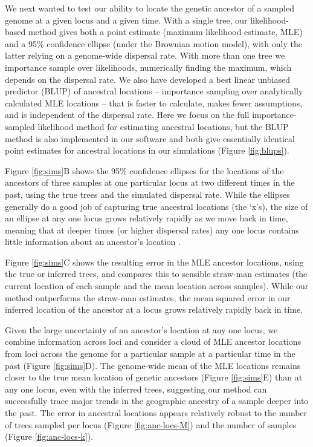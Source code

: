 \documentclass[12pt]{article}
\begin{document}
We next wanted to test our ability to locate the genetic ancestor of a sampled genome at a given locus and a given time.
With a single tree, our likelihood-based method gives both a point estimate (maximum likelihood estimate, MLE) and a 95\% confidence ellipse (under the Brownian motion model), with only the latter relying on a genome-wide dispersal rate. 
With more than one tree we importance sample over likelihoods, numerically finding the maximum, which depends on the dispersal rate. 
We also have developed a best linear unbiased predictor (BLUP) of ancestral locations -- importance sampling over analytically calculated MLE locations -- that is faster to calculate, makes fewer assumptions, and is independent of the dispersal rate. 
Here we focus on the full importance-sampled likelihood method for estimating ancestral locations, but the BLUP method is also implemented in our software and both give essentially identical point estimates for ancestral locations in our simulations (Figure \ref{fig:blups}).

Figure \ref{fig:sims}B shows the 95\% confidence ellipses for the locations of the ancestors of three samples at one particular locus at two different times in the past, using the true trees and the simulated dispersal rate.
While the ellipses generally do a good job of capturing true ancestral locations (the `x's), the size of an ellipse at any one locus grows relatively rapidly as we move back in time, meaning that at deeper times (or higher dispersal rates) any one locus contains little information about an ancestor's location \citep[as is the case for ancestral state reconstruction in phylogenetics;][]{schluter1997likelihood}.

Figure \ref{fig:sims}C shows the resulting error in the MLE ancestor locations, using the true or inferred trees, and compares this to sensible straw-man estimates (the current location of each sample and the mean location across samples).
While our method outperforms the straw-man estimates, the mean squared error in our inferred location of the ancestor at a locus grows relatively rapidly back in time.

Given the large uncertainty of an ancestor's location at any one locus, we combine information across loci and consider a cloud of MLE ancestor locations from loci across the genome for a particular sample at a particular time in the past (Figure \ref{fig:sims}D).
The genome-wide mean of the MLE locations remains closer to the true mean location of genetic ancestors (Figure \ref{fig:sims}E) than at any one locus, even with the inferred trees, suggesting our method can successfully trace major trends in the geographic ancestry of a sample deeper into the past.
The error in ancestral locations appears relatively robust to the number of trees sampled per locus (Figure \ref{fig:anc-locs-M}) and the number of samples (Figure \ref{fig:anc-locs-k}).
\end{document}
